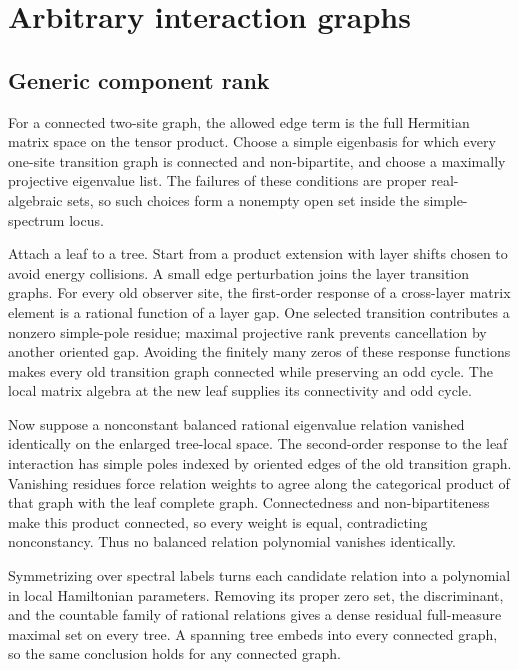 \section{Arbitrary interaction graphs}

\subsection{Generic component rank}

For a connected two-site graph, the allowed edge term is the full Hermitian
matrix space on the tensor product.  Choose a simple eigenbasis for which
every one-site transition graph is connected and non-bipartite, and choose a
maximally projective eigenvalue list.  The failures of these conditions are
proper real-algebraic sets, so such choices form a nonempty open set inside
the simple-spectrum locus.

Attach a leaf to a tree.  Start from a product extension with layer shifts
chosen to avoid energy collisions.  A small edge perturbation joins the
layer transition graphs.  For every old observer site, the first-order
response of a cross-layer matrix element is a rational function of a layer
gap.  One selected transition contributes a nonzero simple-pole residue;
maximal projective rank prevents cancellation by another oriented gap.
Avoiding the finitely many zeros of these response functions makes every old
transition graph connected while preserving an odd cycle.  The local
matrix algebra at the new leaf supplies its connectivity and odd cycle.

Now suppose a nonconstant balanced rational eigenvalue relation vanished
identically on the enlarged tree-local space.  The second-order response to
the leaf interaction has simple poles indexed by oriented edges of the old
transition graph.  Vanishing residues force relation weights to agree
along the categorical product of that graph with the leaf complete graph.
Connectedness and non-bipartiteness make this product connected, so every
weight is equal, contradicting nonconstancy.  Thus no balanced relation
polynomial vanishes identically.

Symmetrizing over spectral labels turns each candidate relation into a
polynomial in local Hamiltonian parameters.  Removing its proper zero set,
the discriminant, and the countable family of rational relations gives a
dense residual full-measure maximal set on every tree.  A spanning tree
embeds into every connected graph, so the same conclusion holds for any
connected graph.

